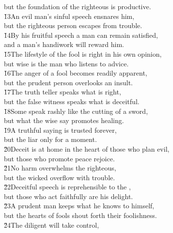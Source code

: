 \begin{poetry}
\poemll    but the foundation of the righteous is productive. \\
\poeml \v{13}An evil man's sinful speech ensnares him, \\
\poemll    but the righteous person escapes from trouble. \\
\poeml \v{14}By his fruitful speech a man can remain satisfied, \\
\poemll    and a man's handiwork will reward him. \\
\poeml \v{15}The lifestyle of the fool is right in his own opinion, \\
\poemll    but wise is the man who listens to advice. \\
\poeml \v{16}The anger of a fool becomes readily apparent, \\
\poemll    but the prudent person overlooks an insult. \\
\poeml \v{17}The truth teller speaks what is right, \\
\poemll    but the false witness speaks what is deceitful. \\
\poeml \v{18}Some speak rashly like the cutting of a sword, \\
\poemll    but what the wise say promotes healing. \\
\poeml \v{19}A truthful saying is trusted forever, \\
\poemll    but the liar only for a moment. \\
\poeml \v{20}Deceit is at home in the heart of those who plan evil, \\
\poemll    but those who promote peace rejoice. \\
\poeml \v{21}No harm overwhelms the righteous, \\
\poemll    but the wicked overflow with trouble. \\
\poeml \v{22}Deceitful speech is reprehensible to the , \\
\poemll    but those who act faithfully are his delight. \\
\poeml \v{23}A prudent man keeps what he knows to himself, \\
\poemll    but the hearts of fools shout forth their foolishness. \\
\poeml \v{24}The diligent will take control, \\

\end{poetry}
